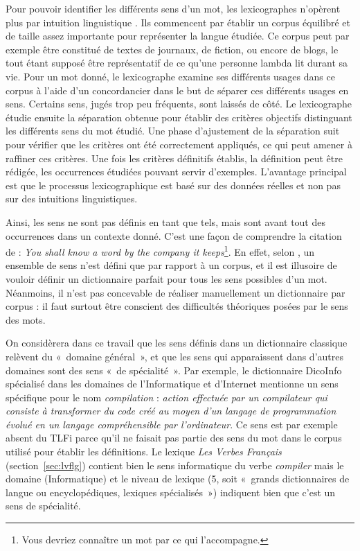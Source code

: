 Pour pouvoir identifier les différents sens d'un mot, les lexicographes
n'opèrent plus par intuition linguistique \citep{kilgarriff1997don}. Ils
commencent par établir un corpus équilibré et de taille assez importante pour
représenter la langue étudiée. Ce corpus peut par exemple être constitué de
textes de journaux, de fiction, ou encore de blogs, le tout étant supposé être
représentatif de ce qu'une personne lambda lit durant sa vie. Pour un mot
donné, le lexicographe examine ses différents usages dans ce corpus à l'aide
d'un concordancier dans le but de séparer ces différents usages en sens.
Certains sens, jugés trop peu fréquents, sont laissés de côté. Le lexicographe
étudie ensuite la séparation obtenue pour établir des critères objectifs
distinguant les différents sens du mot étudié. Une phase d'ajustement de la
séparation suit pour vérifier que les critères ont été correctement appliqués,
ce qui peut amener à raffiner ces critères. Une fois les critères définitifs
établis, la définition peut être rédigée, les occurrences étudiées pouvant
servir d'exemples. L'avantage principal est que le processus lexicographique
est basé sur des données réelles et non pas sur des intuitions linguistiques.

Ainsi, les sens ne sont pas définis en tant que tels, mais sont avant tout des
occurrences dans un contexte donné. C'est une façon de comprendre la citation
de \citep{firth1957synopsys} : \emph{You shall know a word by the company it
keeps}\footnote{Vous devriez connaître un mot par ce qui l'accompagne.}. En
effet, selon \citep{kilgarriff1997don}, un ensemble de sens n'est défini que
par rapport à un corpus, et il est illusoire de vouloir définir un dictionnaire
parfait pour tous les sens possibles d'un mot. Néanmoins, il n'est pas
concevable de réaliser manuellement un dictionnaire par corpus : il faut
surtout être conscient des difficultés théoriques posées par le sens des mots.

On considèrera dans ce travail que les sens définis dans un dictionnaire
classique relèvent du «~domaine général~», et que les sens qui apparaissent
dans d'autres domaines sont des sens «~de spécialité~». Par exemple, le
dictionnaire DicoInfo \citep{corpusolst} spécialisé dans les domaines de
l'Informatique et d'Internet mentionne un sens spécifique pour le nom
\emph{compilation} : \emph{action effectuée par un compilateur qui consiste à
    transformer du code créé au moyen d'un langage de programmation évolué en
un langage compréhensible par l'ordinateur}. Ce sens est par exemple absent du
TLFi \citep{TLFi} parce qu'il ne faisait pas partie des sens du mot dans le
corpus utilisé pour établir les définitions. Le lexique \emph{Les Verbes
Français} (section~\ref{sec:lvflg}) contient bien le sens informatique du verbe
\emph{compiler} mais le domaine (Informatique) et le niveau de lexique (5, soit
«~grands dictionnaires de langue ou encyclopédiques, lexiques spécialisés~»)
indiquent bien que c'est un sens de spécialité.

